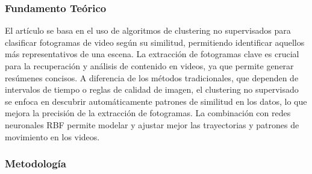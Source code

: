 \subsubsection{Fundamento Teórico}
El artículo se basa en el uso de algoritmos de clustering no supervisados para clasificar fotogramas de video según su similitud, permitiendo identificar aquellos más representativos de una escena. La extracción de fotogramas clave es crucial para la recuperación y análisis de contenido en videos, ya que permite generar resúmenes concisos. A diferencia de los métodos tradicionales, que dependen de intervalos de tiempo o reglas de calidad de imagen, el clustering no supervisado se enfoca en descubrir automáticamente patrones de similitud en los datos, lo que mejora la precisión de la extracción de fotogramas. La combinación con redes neuronales RBF permite modelar y ajustar mejor las trayectorias y patrones de movimiento en los videos.
\subsubsection{Metodología}

